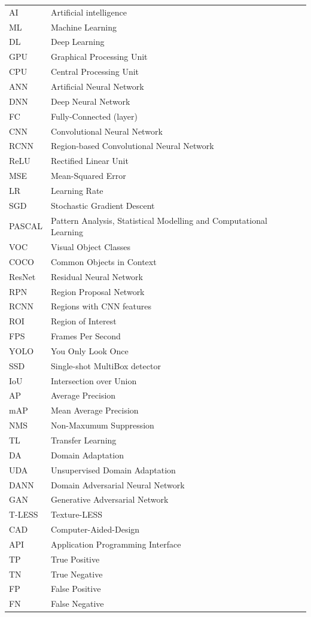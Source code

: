 \documentclass[english, 12pt, a4paper, elec, utf8, a-1b, online]{aaltothesis}
\begin{document}
\begin{tabular}{ll}
AI         & Artificial intelligence\\
ML         & Machine Learning\\
DL         & Deep Learning\\
GPU        & Graphical Processing Unit\\
CPU        & Central Processing Unit\\
ANN        & Artificial Neural Network\\
DNN        & Deep Neural Network\\
FC         & Fully-Connected (layer)\\
CNN        & Convolutional Neural Network\\
RCNN       & Region-based Convolutional Neural Network\\
ReLU       & Rectified Linear Unit\\
MSE        & Mean-Squared Error\\
LR 			&Learning Rate\\
SGD        & Stochastic Gradient Descent\\
PASCAL		& Pattern Analysis, Statistical Modelling and Computational Learning\\
VOC	 		& Visual Object Classes\\
COCO		& Common Objects in Context\\
ResNet		&Residual Neural Network\\
RPN			&Region Proposal Network\\
RCNN		&Regions with CNN features\\
ROI			&Region of Interest\\
FPS			&Frames Per Second\\
YOLO		&You Only Look Once \\
SSD			&Single-shot MultiBox detector\\
IoU 		&Intersection over Union\\
AP			&Average Precision\\
mAP			&Mean Average Precision\\
NMS			&Non-Maxumum Suppression\\
TL			&Transfer Learning\\
DA			&Domain Adaptation\\
UDA			&Unsupervised Domain Adaptation\\
DANN		&Domain Adversarial Neural Network  \\
GAN			&Generative Adversarial Network\\
T-LESS		&Texture-LESS\\
CAD 		&Computer-Aided-Design\\
API			&Application Programming Interface\\
TP			&True Positive\\
TN			&True Negative\\
FP			&False Positive\\
FN			&False Negative\\
\end{tabular}
 
\end{document}
